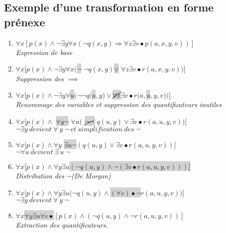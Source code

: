 {\subsection{Exemple d'une transformation en forme prénexe}
\begin{enumerate}
\item $\forall x  [p(x) \land \neg \exists y \forall x ( \neg q(x,y) \Rightarrow \forall z \exists v \bullet p(a,x,y,v))]$\\ \textit{Expression de base}
\item $\forall x [p(x) \land \neg \exists y \forall x ($\colorbox{lightgray}{$\neg$} $\neg q(x,y) $\colorbox{lightgray}{$\lor$} $\forall z \exists v \bullet r(a,x,y,v))]$\\\textit{Suppression des $\implies{}$}
\item $\forall x [p(x) \land \neg \exists y \forall $\colorbox{lightgray}{$u$}$(\neg\neg q($\colorbox{lightgray}{$u$}$,y) \lor $\colorbox{lightgray}{$\cancel{\forall z}$}$\exists v \bullet r(a,$\colorbox{lightgray}{$u$}$,y,v))]$\\\textit{Renommage des variables et suppression des quantificateurs inutiles}
\item $\forall x [p(x) \land$ \colorbox{lightgray}{$\forall y \neg$} $ \forall u($ \colorbox{lightgray}{$\cancel{\neg \neg}$} $q(u,y) \lor \exists v \bullet r(a,u,y,v))] $\\$\neg\exists y\ devient\  \forall \ y\ \neg \ et\ simplification\ des\ \neg$
\item $\forall x [p(x) \land \forall y $ \colorbox{lightgray}{$\exists u \neg$}$(q(u,y) \lor \exists v \bullet r(a,u,y,v))] $\\$\neg\forall u\ devient\  \exists \ u\ \neg$
\item $\forall x [p(x) \land \forall y \exists u $\colorbox{lightgray}{$(\neg q(u,y) \land \neg (\exists v \bullet r(a,u,y,v)))]$}\\ \textit{Distribution des $\neg$}\textit{(De Morgan)}
\item $\forall x [p(x) \land \forall y \exists u (\neg q(u,y) \land $\colorbox{lightgray}{$(\forall v) \bullet \neg$}$ r(a,u,y,v))]$\\$\neg\exists y\ devient\  \forall \ y\ \neg$
\item $\forall x$\colorbox{lightgray}{$ \forall y \exists u \forall v  \bullet$}$ [p(x) \land (\neg q(u,y) \land  \neg r(a,u,y,v))]$\\\textit{Extraction des quantificateurs.}
\end{enumerate}

}
